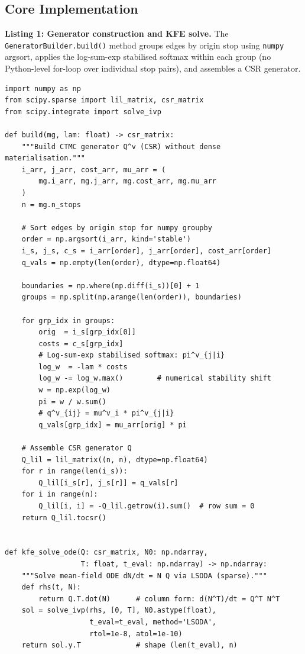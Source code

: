 \documentclass[12pt,a4paper]{article}
\theoremstyle{plain}
\theoremstyle{definition}
\theoremstyle{remark}
\begin{document}
\subsection{Core Implementation}

\textbf{Listing 1: Generator construction and KFE solve.}
The \texttt{GeneratorBuilder.build()} method groups edges by origin stop using
\texttt{numpy} argsort, applies the log-sum-exp stabilised softmax within each
group (no Python-level for-loop over individual stop pairs), and assembles a
CSR generator.

\begin{lstlisting}[caption={Generator construction and KFE solve
  (\texttt{bkk/generator.py}, abridged).},label={lst:generator}]
import numpy as np
from scipy.sparse import lil_matrix, csr_matrix
from scipy.integrate import solve_ivp

def build(mg, lam: float) -> csr_matrix:
    """Build CTMC generator Q^v (CSR) without dense materialisation."""
    i_arr, j_arr, cost_arr, mu_arr = (
        mg.i_arr, mg.j_arr, mg.cost_arr, mg.mu_arr
    )
    n = mg.n_stops

    # Sort edges by origin stop for numpy groupby
    order = np.argsort(i_arr, kind='stable')
    i_s, j_s, c_s = i_arr[order], j_arr[order], cost_arr[order]
    q_vals = np.empty(len(order), dtype=np.float64)

    boundaries = np.where(np.diff(i_s))[0] + 1
    groups = np.split(np.arange(len(order)), boundaries)

    for grp_idx in groups:
        orig  = i_s[grp_idx[0]]
        costs = c_s[grp_idx]
        # Log-sum-exp stabilised softmax: pi^v_{j|i}
        log_w  = -lam * costs
        log_w -= log_w.max()        # numerical stability shift
        w = np.exp(log_w)
        pi = w / w.sum()
        # q^v_{ij} = mu^v_i * pi^v_{j|i}
        q_vals[grp_idx] = mu_arr[orig] * pi

    # Assemble CSR generator Q
    Q_lil = lil_matrix((n, n), dtype=np.float64)
    for r in range(len(i_s)):
        Q_lil[i_s[r], j_s[r]] = q_vals[r]
    for i in range(n):
        Q_lil[i, i] = -Q_lil.getrow(i).sum()  # row sum = 0
    return Q_lil.tocsr()


def kfe_solve_ode(Q: csr_matrix, N0: np.ndarray,
                  T: float, t_eval: np.ndarray) -> np.ndarray:
    """Solve mean-field ODE dN/dt = N Q via LSODA (sparse)."""
    def rhs(t, N):
        return Q.T.dot(N)      # column form: d(N^T)/dt = Q^T N^T
    sol = solve_ivp(rhs, [0, T], N0.astype(float),
                    t_eval=t_eval, method='LSODA',
                    rtol=1e-8, atol=1e-10)
    return sol.y.T             # shape (len(t_eval), n)
\end{lstlisting}
\end{document}
